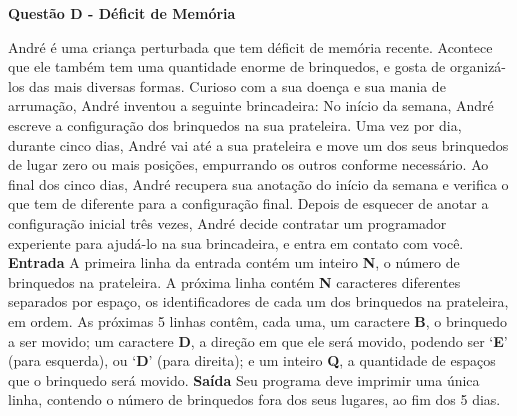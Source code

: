 \documentclass[a4paper, 12pt]{article}
\begin{document}
\newpage %
\begin{center}
\textbf{{\Large Questão D - Déficit de Memória}}
\end{center}
\vspace{5pt}
André é uma criança perturbada que tem déficit de memória recente.
Acontece que ele também tem uma quantidade enorme de brinquedos, e
gosta de organizá-los das mais diversas formas. \newline \newline
Curioso com a sua doença e sua mania de arrumação, André inventou a
seguinte brincadeira:
No início da semana, André escreve a configuração dos brinquedos na sua
prateleira.
Uma vez por dia, durante cinco dias, André vai até a sua prateleira e move
um dos seus brinquedos de lugar zero ou mais posições, empurrando os
outros conforme necessário.
Ao final dos cinco dias, André recupera sua anotação do início da semana e
verifica o que tem de diferente para a configuração final. \newline \newline
Depois de esquecer de anotar a configuração inicial três vezes, André decide
contratar um programador experiente para ajudá-lo na sua brincadeira, e
entra em contato com você.
\newline \newline
\textbf{{\large Entrada}} \newline 
A primeira linha da entrada contém um inteiro \textbf{N}, o número de brinquedos na
prateleira. \newline
A próxima linha contém \textbf{N} caracteres diferentes separados por espaço, os
identificadores de cada um dos brinquedos na prateleira, em ordem. \newline
As próximas 5 linhas contêm, cada uma, um caractere \textbf{B}, o brinquedo a ser
movido; um caractere \textbf{D}, a direção em que ele será movido, podendo ser
`\textbf{E}' (para esquerda), ou `\textbf{D}' (para direita); e um inteiro \textbf{Q}, a quantidade de
espaços que o brinquedo será movido.
\newline \newline
\textbf{{\large Saída}} \newline
Seu programa deve imprimir uma única linha, contendo o número de
brinquedos fora dos seus lugares, ao fim dos 5 dias.
\newline
\end{document}
